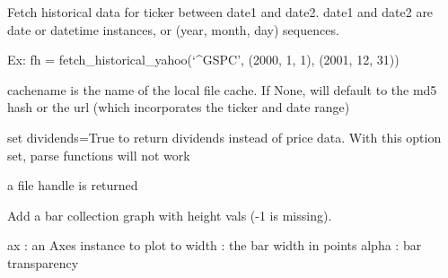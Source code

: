 \documentclass[letterpaper,10pt,english]{sphinxmanual}
\begin{document}
\begin{fulllineitems}
\label{newfinance:newfinance.fetch_historical_yahoo}
Fetch historical data for ticker between date1 and date2.  date1 and
date2 are date or datetime instances, or (year, month, day) sequences.

Ex:
fh = fetch\_historical\_yahoo(`\textasciicircum{}GSPC', (2000, 1, 1), (2001, 12, 31))

cachename is the name of the local file cache.  If None, will
default to the md5 hash or the url (which incorporates the ticker
and date range)

set dividends=True to return dividends instead of price data.  With
this option set, parse functions will not work

a file handle is returned

\end{fulllineitems}


\begin{fulllineitems}
\label{newfinance:newfinance.index_bar}
Add a bar collection graph with height vals (-1 is missing).

ax          : an Axes instance to plot to
width       : the bar width in points
alpha       : bar transparency

\end{fulllineitems}

\end{document}
